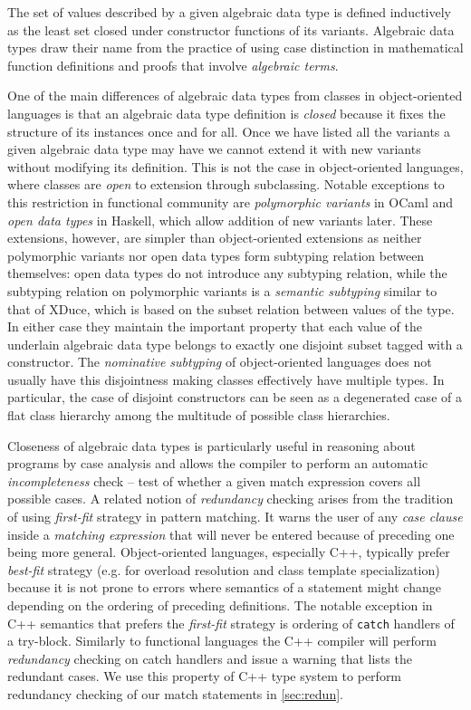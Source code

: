 \documentclass[preprint]{sigplanconf}
\makeatletter
\DeclareRobustCommand{\code}[1]{{\lstinline[breaklines=false,escapechar=@]{#1}}}
\makeatother
\begin{document}
The set of values described by a given algebraic data type is defined 
inductively as the least set closed under constructor functions of its variants.
Algebraic data types draw their name from the practice of using case distinction 
in mathematical function definitions and proofs that involve \emph{algebraic 
terms}.

One of the main differences of algebraic data types from classes in 
object-oriented languages is that an algebraic data type definition is 
\emph{closed} because it fixes the structure of its instances once and for all. 
Once we have listed all the variants a given algebraic data type may have we 
cannot extend it with new variants without modifying its definition. This is not 
the case in object-oriented languages, where classes are \emph{open} to 
extension through subclassing. Notable exceptions to this restriction in 
functional community are \emph{polymorphic variants} in OCaml\cite{garrigue-98} 
and \emph{open data types} in Haskell\cite{LohHinze2006}, which allow addition 
of new variants later. These extensions, however, are simpler than object-oriented 
extensions as neither polymorphic variants nor open data types form subtyping 
relation between themselves: open data types do not introduce any subtyping 
relation, while the subtyping relation on polymorphic variants is a 
\emph{semantic subtyping} similar to that of XDuce\cite{HosoyaPierce2000}, which 
is based on the subset relation between values of the type. In either case they 
maintain the important property that each value of the underlain algebraic data 
type belongs to exactly one disjoint subset tagged with a constructor. The 
\emph{nominative subtyping} of object-oriented languages does not usually have 
this disjointness making classes effectively have multiple types. In particular, 
the case of disjoint constructors can be seen as a degenerated case of a flat 
class hierarchy among the multitude of possible class hierarchies.

Closeness of algebraic data types is particularly useful in reasoning about 
programs by case analysis and allows the compiler to perform an automatic 
\emph{incompleteness} check -- test of whether a given match expression covers all 
possible cases. A related notion of \emph{redundancy} checking arises from the 
tradition of using \emph{first-fit} strategy in pattern matching. It warns the 
user of any \emph{case clause} inside a \emph{matching expression} that will 
never be entered because of preceding one being more general. Object-oriented 
languages, especially C++, typically prefer \emph{best-fit} strategy (e.g. for 
overload resolution and class template specialization) because it is not prone 
to errors where semantics of a statement might change depending on the ordering 
of preceding definitions. The notable exception in C++ semantics that prefers 
the \emph{first-fit} strategy is ordering of \code{catch} handlers of a 
try-block. Similarly to functional languages the C++ compiler will perform 
\emph{redundancy} checking on catch handlers and issue a warning that lists the 
redundant cases. We use this property of C++ type system to perform redundancy 
checking of our match statements in \textsection\ref{sec:redun}.
\end{document}
